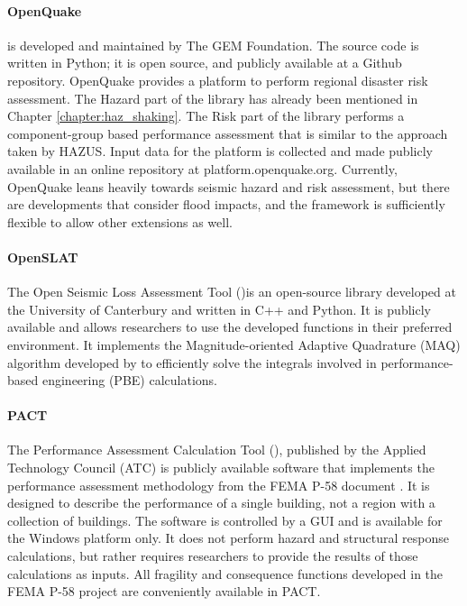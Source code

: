 \paragraph{OpenQuake} 
 is developed and maintained by The GEM Foundation. The source code is written in Python; it is open source, and publicly available at a Github repository. OpenQuake provides a platform to perform regional disaster risk assessment. The Hazard part of the library has already been mentioned in Chapter \ref{chapter:haz_shaking}. The Risk part of the library performs a component-group based performance assessment that is similar to the approach taken by HAZUS. Input data for the platform is collected and made publicly available in an online repository at platform.openquake.org. Currently, OpenQuake leans heavily towards seismic hazard and risk assessment, but there are developments that consider flood impacts, and the framework is sufficiently flexible to allow other extensions as well.

\paragraph{OpenSLAT} The Open Seismic Loss Assessment Tool ()is an open-source library developed at the University of Canterbury and written in C++ and Python. It is publicly available and allows researchers to use the developed functions in their preferred environment. It implements the Magnitude-oriented Adaptive Quadrature (MAQ) algorithm developed by \citet{bradley2010efficient} to efficiently solve the integrals involved in performance-based engineering (PBE) calculations.

\paragraph{PACT} The Performance Assessment Calculation Tool (), published by the Applied Technology Council (ATC) is publicly available software that implements the performance assessment methodology from the FEMA P-58 document \citep{atc2018p-58-2}. It is designed to describe the performance of a single building, not a region with a collection of buildings. The software is controlled by a GUI and is available for the Windows platform only. It does not perform hazard and structural response calculations, but rather requires researchers to provide the results of those calculations as inputs. All fragility and consequence functions developed in the FEMA P-58 project are conveniently available in PACT.

